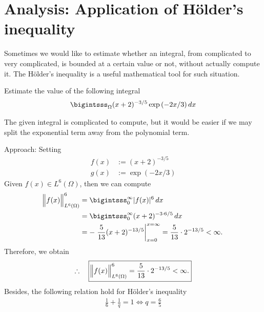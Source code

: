 \documentclass[12pt]{article}
\begin{document}
\section{Analysis: Application of Hölder's inequality}
\begin{observationboxed}
	Sometimes we would like to estimate whether an integral, from complicated to very complicated, 
	is bounded at a certain value or not, without actually compute it. 
	The Hölder's inequality is a useful mathematical tool for such situation.
\end{observationboxed}
\begin{exampleboxed}
	Estimate the value of the following integral
	\begin{align*}
		\bigintsss_{\Omega} (x + 2)^{-3/5} \exp{(-2x/3)} \, dx
	\end{align*}
\end{exampleboxed}
\begin{observationboxed}
	The given integral is complicated to compute, but it would be easier if we may split 
	the exponential term away from the polynomial term.
\end{observationboxed}
Approach:
Setting 
\begin{align}
	f(x) & := (x+2)^{-3/5}  \\
	g(x) & := \exp{(-2x/3)}
\end{align}
Given $f(x) \in L^6(\Omega)$, then we can compute
\begin{align}
	\norm[2]{f(x)}_{L^6(\Omega)}^{6}
	 & = \bigintsss_{0}^{\infty} |f(x)|^6 \,dx  \notag           \\    
	 & = \bigintsss_{0}^{\infty} (x+2)^{-3\cdot 6/5}\,dx  \notag \\
	 & 
	= -\left. \frac{5}{13}(x+2)^{-13/5}\right|_{x=0}^{x=\infty}        
	= \frac{5}{13}\cdot 2^{-13/5} < \infty.    
\end{align}
Therefore, we obtain
\begin{align}
	\therefore\quad\boxed{
		\norm[2]{f(x)}_{L^6(\Omega)}^{6} = \frac{5}{13}\cdot 2^{-13/5} < \infty.
	}
\end{align}
Besides, the following relation hold for Hölder's inequality
\begin{align}
	\frac{1}{6} + \frac{1}{q} = 1 \Leftrightarrow q = \frac{6}{5}
\end{align}
\end{document}

